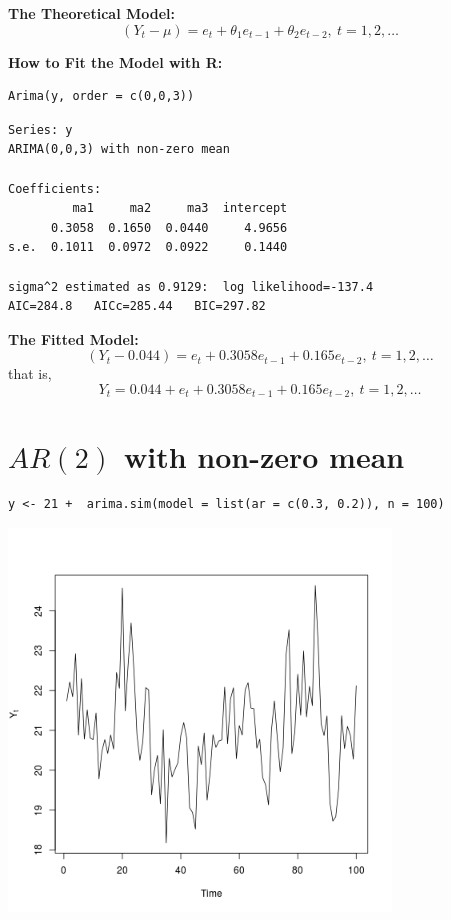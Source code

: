 \documentclass[12pt]{article}
\begin{document}
\noindent
\textbf{The Theoretical Model:} 
\[
(Y_{t} - \mu) = e_{t} + \theta_{1}e_{t - 1} + \theta_{2}e_{t - 2},\ t = 1,2,\ldots
\]

\noindent
\textbf{How to Fit the Model with R:}

\begin{verbatim}
Arima(y, order = c(0,0,3))
\end{verbatim}





\begin{verbatim}
Series: y 
ARIMA(0,0,3) with non-zero mean 

Coefficients:
         ma1     ma2     ma3  intercept
      0.3058  0.1650  0.0440     4.9656
s.e.  0.1011  0.0972  0.0922     0.1440

sigma^2 estimated as 0.9129:  log likelihood=-137.4
AIC=284.8   AICc=285.44   BIC=297.82
\end{verbatim}

\noindent
\textbf{The Fitted Model:} 
\[
(Y_{t} -  0.044) = e_{t} +  0.3058 e_{t - 1} +  0.165 e_{t - 2},\ t = 1,2,\ldots
\]
that is,
\[
Y_{t} =  0.044 + e_{t} +  0.3058 e_{t - 1} +  0.165 e_{t - 2},\ t = 1,2,\ldots
\]
\section*{$AR(2)$ with non-zero mean}
\label{sec-4}


\begin{verbatim}
y <- 21 +  arima.sim(model = list(ar = c(0.3, 0.2)), n = 100)
\end{verbatim}





\includegraphics[width=4.0in]{img/ar2nzm.png}
\end{document}
